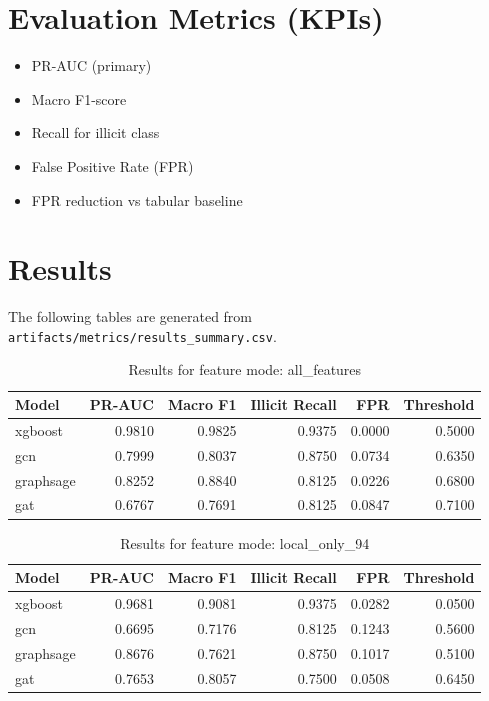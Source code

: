 \documentclass[12pt,a4paper]{article}
\begin{document}
\section{Evaluation Metrics (KPIs)}
\begin{itemize}
\item PR-AUC (primary)
\item Macro F1-score
\item Recall for illicit class
\item False Positive Rate (FPR)
\item FPR reduction vs tabular baseline
\end{itemize}

\section{Results}
The following tables are generated from \texttt{artifacts/metrics/results\_summary.csv}.

\begin{table}[H]
\centering
\small
\begin{tabular}{lrrrrr}
\toprule
Model & PR-AUC & Macro F1 & Illicit Recall & FPR & Threshold \\
\midrule
xgboost & 0.9810 & 0.9825 & 0.9375 & 0.0000 & 0.5000 \\
gcn & 0.7999 & 0.8037 & 0.8750 & 0.0734 & 0.6350 \\
graphsage & 0.8252 & 0.8840 & 0.8125 & 0.0226 & 0.6800 \\
gat & 0.6767 & 0.7691 & 0.8125 & 0.0847 & 0.7100 \\
\bottomrule
\end{tabular}
\caption{Results for feature mode: all\_features}
\end{table}

\begin{table}[H]
\centering
\small
\begin{tabular}{lrrrrr}
\toprule
Model & PR-AUC & Macro F1 & Illicit Recall & FPR & Threshold \\
\midrule
xgboost & 0.9681 & 0.9081 & 0.9375 & 0.0282 & 0.0500 \\
gcn & 0.6695 & 0.7176 & 0.8125 & 0.1243 & 0.5600 \\
graphsage & 0.8676 & 0.7621 & 0.8750 & 0.1017 & 0.5100 \\
gat & 0.7653 & 0.8057 & 0.7500 & 0.0508 & 0.6450 \\
\bottomrule
\end{tabular}
\caption{Results for feature mode: local\_only\_94}
\end{table}
\end{document}
